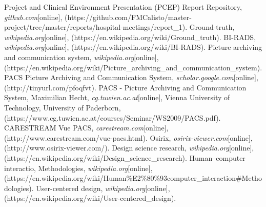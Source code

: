 \begin{thebibliography}{}
 Project and Clinical Environment Presentation (PCEP) Report Repository, \emph{github.com}[online], (https://github.com/FMCalisto/master-project/tree/master/reports/hospital-meetings/report\_1).
 Ground-truth, \emph{wikipedia.org}[online], (https://en.wikipedia.org/wiki/Ground\_truth).
 BI-RADS, \emph{wikipedia.org}[online], (https://en.wikipedia.org/wiki/BI-RADS).
 Picture archiving and communication system, \emph{wikipedia.org}[online], (https://en.wikipedia.org/wiki/Picture\_archiving\_and\_communication\_system).
 PACS Picture Archiving and Communication System, \emph{scholar.google.com}[online], (http://tinyurl.com/pfoqfvt).
 PACS - Picture Archiving and Communication System, Maximilian Hecht, \emph{cg.tuwien.ac.at}[online], Vienna University of Technology, University of Paderborn, (https://www.cg.tuwien.ac.at/courses/Seminar/WS2009/PACS.pdf).
 CARESTREAM Vue PACS, \emph{carestream.com}[online], (http://www.carestream.com/vue-pacs.html).
 Osirix, \emph{osirix-viewer.com}[online], (http://www.osirix-viewer.com/).
 Design science research, \emph{wikipedia.org}[online], (https://en.wikipedia.org/wiki/Design\_science\_research).
 Human–computer interactio, Methodologies, \emph{wikipedia.org}[online], (https://en.wikipedia.org/wiki/Human\%E2\%80\%93computer\_interaction\#Methodologies).
 User-centered design, \emph{wikipedia.org}[online], (https://en.wikipedia.org/wiki/User-centered\_design).
\end{thebibliography}



